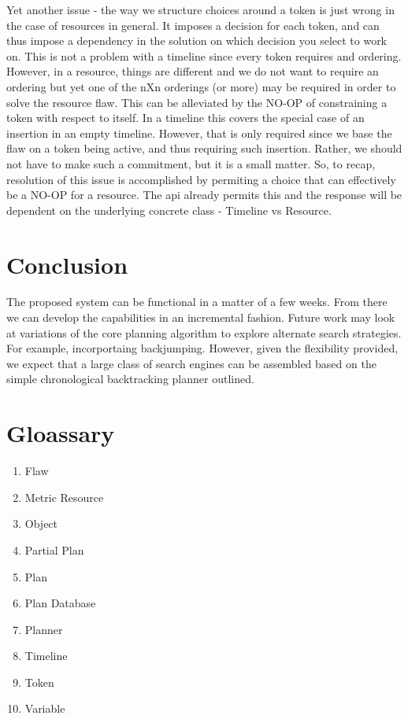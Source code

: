 \documentclass[10pt, letterpaper, oneside]{article}
\begin{document}
Yet another issue - the way we structure choices around a token is just wrong in the case of resources in general. It imposes a decision for each token, and can thus impose a dependency in the solution on which decision you select to work on. This is not a problem with a timeline since every token requires and ordering. However, in a resource, things are different and we do not want to require an ordering but yet one of the nXn orderings (or more) may be required in order to solve the resource flaw. This can be alleviated by the NO-OP of constraining a token with respect to itself. In a timeline this covers the special case of an insertion in an empty timeline. However, that is only required since we base the flaw on a token being active, and thus requiring such insertion. Rather, we should not have to make such a commitment, but it is a small matter. So, to recap, resolution of this issue is accomplished by permiting a choice that can effectively be a NO-OP for a resource. The api already permits this and the response will be dependent on the underlying concrete class - Timeline vs Resource.
 
\section{Conclusion}
The proposed system can be functional in a matter of a few weeks. From there we can develop the capabilities in an incremental fashion. Future work may look at variations of the core planning algorithm to explore alternate search strategies. For example, incorportaing backjumping. However, given the flexibility provided, we expect that a large class of search engines can be assembled based on the simple chronological backtracking planner outlined.
\section{Gloassary}
\begin{enumerate}
\item Flaw
\item Metric Resource
\item Object
\item Partial Plan
\item Plan
\item Plan Database
\item Planner
\item Timeline
\item Token
\item Variable
\end{enumerate}
\end{document}
